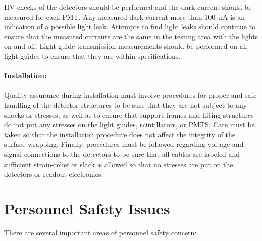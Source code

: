 HV checks of the detectors should be performed and the dark current should 
be measured for each PMT.  Any measured dark current more than 100~nA is 
an indication of a possible light leak.  Attempts to find light leaks should 
continue to ensure that the measured currents are the same in the testing 
area with the lights on and off.  Light guide transmission measurements 
should be performed on all light guides to ensure that they are within 
specifications.

\paragraph{Installation:} 

Quality assurance during installation must involve procedures for proper 
and safe handling of the detector structures to be sure that they are not 
subject to any shocks or stresses, as well as to ensure that support 
frames and lifting structures do not put any stresses on the light guides, 
scintillators, or PMTS.  Care must be taken so that the installation 
procedure does not affect the integrity of the surface wrapping.  Finally, 
procedures must be followed regarding voltage and signal connections to the 
detectors to be sure that all cables are labeled and sufficient strain-relief 
or slack is allowed so that no stresses are put on the detectors or readout 
electronics. 

\section{Personnel Safety Issues}

There are several important areas of personnel safety concern:

